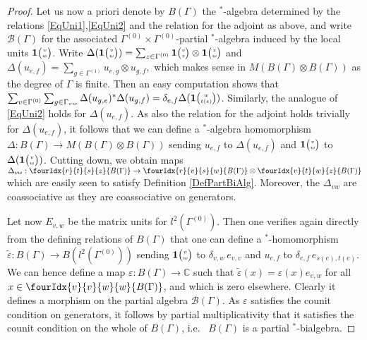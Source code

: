 \documentclass[10pt]{article}
\newcommand{\C}{\mathbb{C}}
\newcommand{\Grt}[3]{#1{\tiny {\begin{pmatrix} #2\\#3\end{pmatrix}}}}
\newcommand{\UnitC}[2]{\Grt{\mathbf{1}}{#1}{#2}}
\newcommand{\Gr}[5]{\fourIdx{#2}{#4}{#3}{#5}{#1}}%
\theoremstyle{definition}
\numberwithin{equation}{section}
\begin{document}
\begin{proof}
Let us now a priori denote by $B(\Gamma)$ the $^*$-algebra determined by the relations \eqref{EqUni1},\eqref{EqUni2} and the relation for the adjoint as above, and write $\mathscr{B}(\Gamma)$ for the associated $\Gamma^{(0)}\times \Gamma^{(0)}$-partial $^*$-algebra induced by the local units $\UnitC{v}{w}$. Write $\Delta(\UnitC{v}{w}) = \sum_{z\in \Gamma^{(0)}} \UnitC{v}{z}\otimes \UnitC{z}{w}$ and $\Delta(u_{e,f}) = \sum_{g\in \Gamma^{(1)}} u_{e,g}\otimes u_{g,f},$ which makes sense in $M(B(\Gamma)\otimes B(\Gamma))$ as the degree of $\Gamma$ is finite. Then an easy computation shows that $ \sum_{v\in \Gamma^{(0)}}\sum_{g\in \Gamma_{vw}}\Delta(u_{g,e})^*\Delta(u_{g,f})= \delta_{e,f} \Delta(\UnitC{w}{t(e)})$. Similarly, the analogue of \eqref{EqUni2} holds for $\Delta(u_{e,f})$. As also the relation for the adjoint holds trivially for $\Delta(u_{e,f})$, it follows that we can define a $^*$-algebra homomorphism $\Delta:B(\Gamma)\rightarrow M(B(\Gamma)\otimes B(\Gamma))$ sending $u_{e,f}$ to $\Delta(u_{e,f})$ and $\UnitC{v}{w}$ to $\Delta(\UnitC{v}{w})$. Cutting down, we obtain maps $\Delta_{vw}:\Gr{B(\Gamma)}{r}{s}{t}{z}\rightarrow \Gr{B(\Gamma)}{r}{s}{v}{w}\otimes \Gr{B(\Gamma)}{v}{w}{t}{z}$ which are easily seen to satisfy Definition \ref{DefPartBiAlg}. Moreover, the $\Delta_{vw}$ are coassociative as they are coassociative on generators.

Let now $E_{v,w}$ be the matrix units for $l^2(\Gamma^{(0)})$. Then one verifies again directly from the defining relations of $B(\Gamma)$ that one can define a $^*$-homomorphism $\widetilde{\varepsilon}: B(\Gamma)\rightarrow B(l^2(\Gamma^{(0)}))$ sending $\UnitC{v}{w}$ to $\delta_{v,w}\, e_{v,v}$ and $u_{e,f}$ to $\delta_{e,f}\, e_{s(e),t(e)}$. We can hence define a map $\varepsilon: B(\Gamma)\rightarrow \C$ such that $\widetilde{\varepsilon}(x) = \varepsilon(x) e_{v,w}$ for all $x\in \Gr{B(\Gamma)}{v}{w}{v}{w}$, and which is zero elsewhere. Clearly it defines a morphism on the partial algebra $\mathscr{B}(\Gamma)$. As $\varepsilon$ satisfies the counit condition on generators, it follows by partial multiplicativity that it satisfies the counit condition on the whole of $B(\Gamma)$, i.e.~ $B(\Gamma)$ is a partial $^*$-bialgebra. 


\end{proof}
\end{document}
